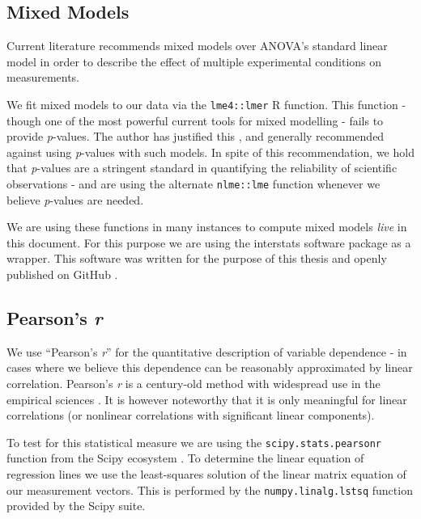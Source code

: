 	\subsection{Mixed Models}\label{sec:m_sa_lm}
	    Current literature \citep{Baayen2008} recommends mixed models over ANOVA's standard linear model in order to describe the effect of multiple experimental conditions on measurements.
	    
	    We fit mixed models to our data via the \colorbox{vlg}{\texttt{lme4::lmer}} \citep{Bates2005,Bates2007} R function.
	    This function - though one of the most powerful current tools for mixed modelling - fails to provide \textit{p}-values.
	    The author has justified this \citep{Bates2006}, and generally recommended against using \textit{p}-values with such models.
	    In spite of this recommendation, we hold that \textit{p}-values are a stringent standard in quantifying the reliability of scientific observations -
	    and are using the alternate \colorbox{vlg}{\texttt{nlme::lme}} \citep{Pinheiro2013} function whenever we believe \textit{p}-values are needed.
	    
	    We are using these functions in many instances to compute mixed models \textit{live} in this document.
	    For this purpose we are using the interstats \citep{interstats} software package as a wrapper.
	    This software was written for the purpose of this thesis and openly published on GitHub \citep{github}.
	\subsection{Pearson's \textit{r}}
	    We use “Pearson's \textit{r}” for the quantitative description of variable dependence - in cases where we believe this dependence can be reasonably approximated by linear correlation.
	    Pearson's \textit{r} is a century-old method with widespread use in the empirical sciences \citep{Stigler1989}.
	    It is however noteworthy that it is only meaningful for linear correlations (or nonlinear correlations with significant linear components).
	    
	    To test for this statistical measure we are using the \colorbox{vlg}{\texttt{scipy.stats.pearsonr}} function from the Scipy ecosystem \citep{scipy,Oliphant2007}.
	    To determine the linear equation of regression lines we use the least-squares solution of the linear matrix equation of our measurement vectors.
	    This is performed by the \colorbox{vlg}{\texttt{numpy.linalg.lstsq}} function provided by the Scipy suite.
